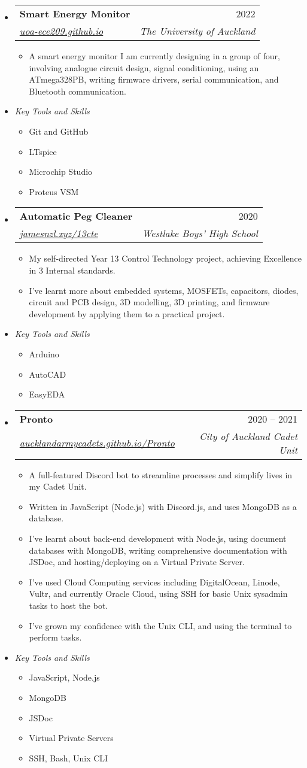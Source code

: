 \documentclass[11pt,a4paper]{article}[leftmargin=*]
\makeatletter
\def \entryspacing {-0pt}
\newcommand{\resumeEntryStart}{\begin{itemize}[leftmargin=2.5mm]}
\newcommand{\resumeEntryEnd}{\end{itemize}\vspace{\entryspacing}}
\newcommand{\resumeItemListStart}{\begin{itemize}[leftmargin=4.5mm]}
\newcommand{\resumeItemListEnd}{\end{itemize}}
\newcommand{\resumeItem}[1]{
  \item\small{
    {#1 \vspace{-2pt}}
  }
}
\newcommand{\resumeEntryTSDL}[4]{
  \vspace{-1pt}\item[]
    \begin{tabularx}{0.97\textwidth}{X@{\hspace{60pt}}r}
      \textbf{\color{primary}#1} & {\firabook\color{accent}\small#2} \\
      \textit{\color{accent}\small#3} & \textit{\color{accent}\small#4} \\
    \end{tabularx}\vspace{-6pt}
}
\newcommand{\resumeEntryE}[1]{
  \item[]\small{
    \textit{\color{accent}\small#1 \vspace{-6pt}}
  }\\
}
\makeatother
\begin{document}
\resumeEntryStart
\resumeEntryTSDL
{Smart Energy Monitor}{2022}
{\href{https://uoa-ece209.github.io}{uoa-ece209.github.io}}{The University of Auckland}
\resumeItemListStart
\resumeItem {A smart energy monitor I am currently designing in a group of four, involving analogue circuit design, signal conditioning, using an ATmega328PB, writing firmware drivers, serial communication, and Bluetooth communication.}
\resumeItemListEnd
\resumeEntryE{Key Tools and Skills}
\resumeItemListStart
\resumeItem {Git and GitHub}
\resumeItem {LTspice}
\resumeItem {Microchip Studio}
\resumeItem {Proteus VSM}
\resumeItemListEnd
\resumeEntryEnd

\resumeEntryStart
\resumeEntryTSDL
{Automatic Peg Cleaner}{2020}
{\href{https://jamesnzl.xyz/13cte}{jamesnzl.xyz/13cte}}{Westlake Boys' High School}
\resumeItemListStart
\resumeItem {My self-directed Year 13 Control Technology project, achieving Excellence in 3 Internal standards.}
\resumeItem {I’ve learnt more about embedded systems, MOSFETs, capacitors, diodes, circuit and PCB design, 3D modelling, 3D printing, and firmware development by applying them to a practical project.}
\resumeItemListEnd
\resumeEntryE{Key Tools and Skills}
\resumeItemListStart
\resumeItem {Arduino}
\resumeItem {AutoCAD}
\resumeItem {EasyEDA}
\resumeItemListEnd
\resumeEntryEnd

\resumeEntryStart
\resumeEntryTSDL
{Pronto}{2020 -- 2021}
{\href{https://aucklandarmycadets.github.io/Pronto/}{aucklandarmycadets.github.io/Pronto}}{City of Auckland Cadet Unit}
\resumeItemListStart
\resumeItem {A full-featured Discord bot to streamline processes and simplify lives in my Cadet Unit.}
\resumeItem {Written in JavaScript (Node.js) with Discord.js, and uses MongoDB as a database.}
\resumeItem {I've learnt about back-end development with Node.js, using document databases with MongoDB, writing comprehensive documentation with JSDoc, and hosting/deploying on a Virtual Private Server.}
\resumeItem {I've used Cloud Computing services including DigitalOcean, Linode, Vultr, and currently Oracle Cloud, using SSH for basic Unix sysadmin tasks to host the bot.}
\resumeItem {I've grown my confidence with the Unix CLI, and using the terminal to perform tasks.}
\resumeItemListEnd
\resumeEntryE{Key Tools and Skills}
\resumeItemListStart
\resumeItem {JavaScript, Node.js}
\resumeItem {MongoDB}
\resumeItem {JSDoc}
\resumeItem {Virtual Private Servers}
\resumeItem {SSH, Bash, Unix CLI}
\resumeItemListEnd
\resumeEntryEnd
\end{document}
